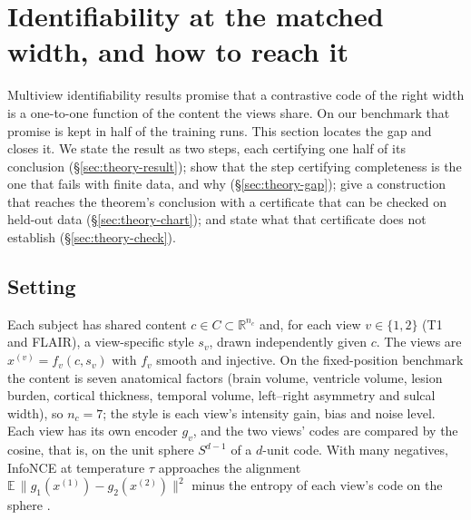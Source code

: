 \makeatletter
{}
\makeatother
\providecommand{\R}{\mathbb{R}}
\providecommand{\pending}[1]{{\color{red}\textbf{[PENDING: #1]}}}
\providecommand{\todo}[1]{{\color{blue}\small[TODO: #1]}}

\section{Identifiability at the matched width, and how to reach it}
\label{sec:theory}

Multiview identifiability results promise that a contrastive code of the right
width is a one-to-one function of the content the views share. On our benchmark
that promise is kept in half of the training runs. This section locates the gap
and closes it. We state the result as two steps, each certifying one half of its
conclusion (\S\ref{sec:theory-result}); show that the step certifying
completeness is the one that fails with finite data, and why
(\S\ref{sec:theory-gap}); give a construction that reaches the theorem's
conclusion with a certificate that can be checked on held-out data
(\S\ref{sec:theory-chart}); and state what that certificate does not establish
(\S\ref{sec:theory-check}).

\subsection{Setting}
\label{sec:theory-setting}

Each subject has shared content $c \in C \subset \R^{n_c}$ and, for each view
$v \in \{1, 2\}$ (T1 and FLAIR), a view-specific style $s_v$, drawn
independently given $c$. The views are $x^{(v)} = f_v(c, s_v)$ with $f_v$
smooth and injective. On the fixed-position benchmark the content is seven
anatomical factors (brain volume, ventricle volume, lesion burden, cortical
thickness, temporal volume, left--right asymmetry and sulcal width), so
$n_c = 7$; the style is each view's intensity gain, bias and noise level. Each
view has its own encoder $g_v$, and the two views' codes are compared by the
cosine, that is, on the unit sphere $S^{d-1}$ of a $d$-unit code. With many
negatives, InfoNCE at temperature $\tau$ approaches the alignment
$\mathbb{E}\,\lVert g_1(x^{(1)}) - g_2(x^{(2)}) \rVert^2$ minus the entropy of
each view's code on the sphere \citep{wang2020alignment,zimmermann2021contrastive}.

